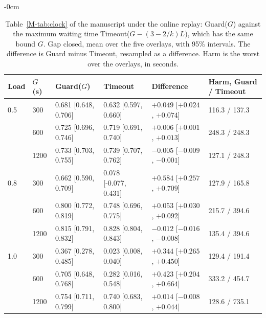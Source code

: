 \documentclass[mathematics,supfile,submit,moreauthors]{Definitions/mdpi}
\newcommand{\devnum}[1]{#1}
\begin{document}

\begin{table}[htbp]
\begin{adjustwidth}{-\extralength}{0cm}
\centering
\caption{Table~\ref*{M-tab:clock} of the manuscript under the online replay: Guard($G$)
against the maximum waiting time Timeout($G - (3-2/k)L$), which has the same bound $G$. Gap
closed, mean over the five overlays, with \devnum{95\%} intervals. The difference is Guard
minus Timeout, resampled as a difference. Harm is the worst over the overlays, in seconds.}
\label{tab:s_online_clock}
\small
\setlength{\tabcolsep}{3pt}
\begin{tabular}{llllll}
\toprule
Load & $G$ (s) & Guard($G$) & Timeout & Difference & Harm, Guard / Timeout \\
\midrule
\devnum{0.5} & \devnum{300} & \devnum{0.681 [0.648, 0.706]} & \devnum{0.632 [0.597, 0.660]} & \devnum{$+0.049$ [$+0.024$, $+0.074$]} & \devnum{116.3} / \devnum{137.3} \\
 & \devnum{600} & \devnum{0.725 [0.696, 0.746]} & \devnum{0.719 [0.691, 0.740]} & \devnum{$+0.006$ [$+0.001$, $+0.013$]} & \devnum{248.3} / \devnum{248.3} \\
 & \devnum{1200} & \devnum{0.733 [0.703, 0.755]} & \devnum{0.739 [0.707, 0.762]} & \devnum{$-0.005$ [$-0.009$, $-0.001$]} & \devnum{127.1} / \devnum{248.3} \\
\midrule
\devnum{0.8} & \devnum{300} & \devnum{0.662 [0.590, 0.709]} & \devnum{0.078 [-0.077, 0.431]} & \devnum{$+0.584$ [$+0.257$, $+0.709$]} & \devnum{127.9} / \devnum{165.8} \\
 & \devnum{600} & \devnum{0.800 [0.772, 0.819]} & \devnum{0.748 [0.696, 0.775]} & \devnum{$+0.053$ [$+0.030$, $+0.092$]} & \devnum{215.7} / \devnum{394.6} \\
 & \devnum{1200} & \devnum{0.815 [0.791, 0.832]} & \devnum{0.828 [0.804, 0.843]} & \devnum{$-0.012$ [$-0.016$, $-0.008$]} & \devnum{135.4} / \devnum{394.6} \\
\midrule
\devnum{1.0} & \devnum{300} & \devnum{0.367 [0.278, 0.485]} & \devnum{0.023 [0.008, 0.040]} & \devnum{$+0.344$ [$+0.265$, $+0.450$]} & \devnum{129.4} / \devnum{191.4} \\
 & \devnum{600} & \devnum{0.705 [0.648, 0.768]} & \devnum{0.282 [0.016, 0.548]} & \devnum{$+0.423$ [$+0.204$, $+0.664$]} & \devnum{333.2} / \devnum{454.7} \\
 & \devnum{1200} & \devnum{0.754 [0.711, 0.799]} & \devnum{0.740 [0.683, 0.800]} & \devnum{$+0.014$ [$-0.008$, $+0.044$]} & \devnum{128.6} / \devnum{735.1} \\
\bottomrule
\end{tabular}
\end{adjustwidth}
\end{table}
\end{document}
